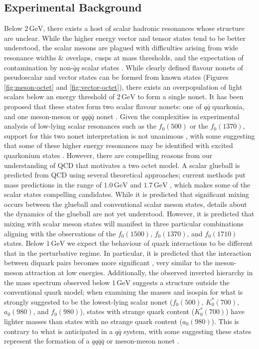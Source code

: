 \documentclass[aps,prd,onecolumn,showpacs,amsmath,amssymb,nofootinbib]{revtex4} \pdfoutput=1
\newcommand{\gev}{\mathrm{GeV}}
\begin{document}
\subsection{Experimental Background}
Below $2\,\mathrm{GeV}$, there exists a host of scalar hadronic resonances whose structure are unclear. While the higher energy vector and tensor states tend to be better understood, the scalar mesons are plagued with difficulties arising from wide resonance widths \& overlaps, cusps at mass thresholds, and the expectation of contamination by non-$\bar{q}q$ scalar states \cite{PDG2018}. While clearly defined flavour nonets of pseudoscalar and vector states can be formed from known states (Figures \ref{fig:meson-octet} and \ref{fig:vector-octet}), there exists an overpopulation of light scalars below an energy threshold of $2\,\gev$ to form a single nonet. It has been proposed that these states form two scalar flavour nonets: one of $q\bar q$ quarkonia, and one meson-meson or $qq\bar{q}\bar{q}$ nonet \cite{Jaffe1977,Close2002,tHooft2008}. Given the complexities in experimental analysis of low-lying scalar resonances such as the $f_0(500)$ or the $f_0(1370)$, support for this two nonet interpretation is not unanimous \cite{Ochs2001,Zhang2011}, with some suggesting that some of these higher energy resonances may be identified with excited quarkonium states \cite{Parganlija2017}. However, there are compelling reasons from our understanding of QCD that motivates a two octet model. A scalar glueball is predicted from QCD using several theoretical approaches; current methods put mass predictions in the range of $1.0\,\gev$ and $1.7\,\gev$ \cite{Mathieu:2008me,Ochs2013}, which makes some of the scalar states compelling candidates. While it is predicted that significant mixing occurs between the glueball and conventional scalar meson states, details about the dynamics of the glueball are not yet understood. However, it is predicted that mixing with scalar meson states will manifest in three particular combinations aligning with the observations of the $f_0(1500)$, $f_0(1370)$, and $f_0(1710)$ states. Below $1\,\gev$ we expect the behaviour of quark interactions to be different that in the perturbative regime. In particular, it is predicted that the interaction between diquark pairs becomes more significant \cite{Jaffe1977}, very similar to the meson-meson attraction at low energies. Additionally, the observed inverted hierarchy in the mass spectrum observed below $1\,\gev$ suggests a structure outside the conventional quark model; when examining the masses and isospin for what is strongly suggested to be the lowest-lying scalar nonet ($f_0(500)$, $K_0^{*}(700)$, $a_0(980)$, and $f_0(980)$), states with strange quark content ($K_0^{*}(700)$) have lighter masses than states with no strange quark content ($a_0(980)$). This is contrary to what is anticipated in a $q\bar q$ system, with some suggesting these states represent the formation of a $qq\bar{q}\bar{q}$ or meson-meson nonet  \cite{Jaffe1977, Pelaez2011}.  
\end{document}
